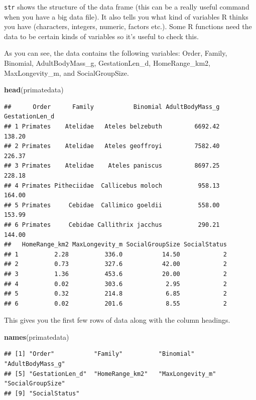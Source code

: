 \documentclass[]{book}
\newenvironment{Shaded}{\begin{snugshade}}{\end{snugshade}}
\newcommand{\KeywordTok}[1]{\textcolor[rgb]{0.13,0.29,0.53}{\textbf{{#1}}}}
\newcommand{\NormalTok}[1]{{#1}}
\theoremstyle{definition}
\theoremstyle{definition}
\theoremstyle{definition}
\theoremstyle{remark}
\begin{document}
\texttt{str} shows the structure of the data frame (this can be a really
useful command when you have a big data file). It also tells you what
kind of variables R thinks you have (characters, integers, numeric,
factors etc.). Some R functions need the data to be certain kinds of
variables so it's useful to check this.

As you can see, the data contains the following variables: Order,
Family, Binomial, AdultBodyMass\_g, GestationLen\_d, HomeRange\_km2,
MaxLongevity\_m, and SocialGroupSize.

\begin{Shaded}
\begin{Highlighting}[]
\KeywordTok{head}\NormalTok{(primatedata)}
\end{Highlighting}
\end{Shaded}

\begin{verbatim}
##      Order      Family           Binomial AdultBodyMass_g GestationLen_d
## 1 Primates    Atelidae   Ateles belzebuth         6692.42         138.20
## 2 Primates    Atelidae   Ateles geoffroyi         7582.40         226.37
## 3 Primates    Atelidae    Ateles paniscus         8697.25         228.18
## 4 Primates Pitheciidae  Callicebus moloch          958.13         164.00
## 5 Primates     Cebidae  Callimico goeldii          558.00         153.99
## 6 Primates     Cebidae Callithrix jacchus          290.21         144.00
##   HomeRange_km2 MaxLongevity_m SocialGroupSize SocialStatus
## 1          2.28          336.0           14.50            2
## 2          0.73          327.6           42.00            2
## 3          1.36          453.6           20.00            2
## 4          0.02          303.6            2.95            2
## 5          0.32          214.8            6.85            2
## 6          0.02          201.6            8.55            2
\end{verbatim}

This gives you the first few rows of data along with the column
headings.

\begin{Shaded}
\begin{Highlighting}[]
\KeywordTok{names}\NormalTok{(primatedata)}
\end{Highlighting}
\end{Shaded}

\begin{verbatim}
## [1] "Order"           "Family"          "Binomial"        "AdultBodyMass_g"
## [5] "GestationLen_d"  "HomeRange_km2"   "MaxLongevity_m"  "SocialGroupSize"
## [9] "SocialStatus"
\end{verbatim}
\end{document}
